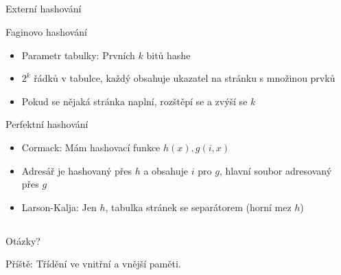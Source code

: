 \documentclass{beamer}
\begin{document}
\subsection{}
\begin{frame}{Externí hashování}
\begin{block}{Faginovo hashování}
\begin{itemize}
\item Parametr tabulky: Prvních $k$ bitů hashe
\item $2^k$ řádků v tabulce, každý obsahuje ukazatel na stránku s množinou prvků
\item Pokud se nějaká stránka naplní, rozštěpí se a zvýší se $k$
\end{itemize}
\end{block}
\begin{block}{Perfektní hashování}
\begin{itemize}
\item Cormack: Mám hashovací funkce $h(x), g(i, x)$
\item Adresář je hashovaný přes $h$ a obsahuje $i$ pro $g$, hlavní soubor adresovaný přes $g$
\item Larson-Kalja: Jen $h$, tabulka stránek se separátorem (horní mez $h$)
\end{itemize}
\end{block}
\end{frame}

\subsection{}
\begin{frame}{Otázky?}
\begin{center}
Příště: Třídění ve vnitřní a vnější paměti.
\end{center}
\end{frame}

\subsection{}
\end{document}

